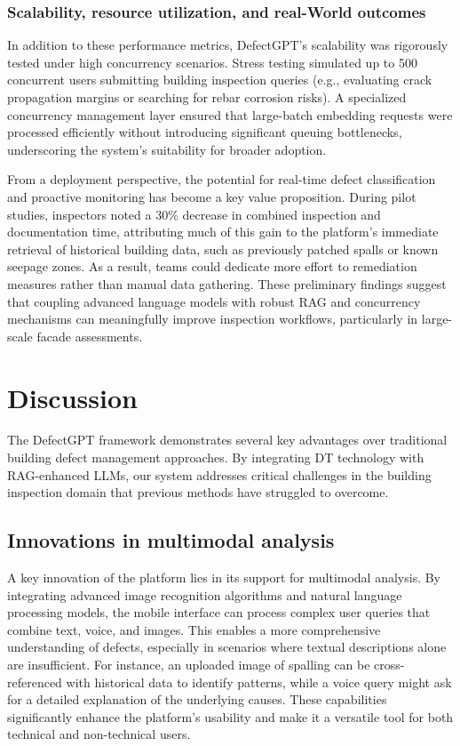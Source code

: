 \documentclass[a4paper,fleqn]{cas-sc}
\begin{document}
\subsubsection{Scalability, resource utilization, and real-World outcomes}

In addition to these performance metrics, DefectGPT's scalability was rigorously tested under high concurrency scenarios. Stress testing simulated up to 500 concurrent users submitting building inspection queries (e.g., evaluating crack propagation margins or searching for rebar corrosion risks). A specialized concurrency management layer ensured that large-batch embedding requests were processed efficiently without introducing significant queuing bottlenecks, underscoring the system's suitability for broader adoption.

From a deployment perspective, the potential for real-time defect classification and proactive monitoring has become a key value proposition. During pilot studies, inspectors noted a 30\% decrease in combined inspection and documentation time, attributing much of this gain to the platform's immediate retrieval of historical building data, such as previously patched spalls or known seepage zones. As a result, teams could dedicate more effort to remediation measures rather than manual data gathering. These preliminary findings suggest that coupling advanced language models with robust RAG and concurrency mechanisms can meaningfully improve inspection workflows, particularly in large-scale facade assessments.

\section{Discussion}
\label{sec:discussion}

The DefectGPT framework demonstrates several key advantages over traditional building defect management approaches. By integrating DT technology with RAG-enhanced LLMs, our system addresses critical challenges in the building inspection domain that previous methods have struggled to overcome.

\subsection{Innovations in multimodal analysis}

A key innovation of the platform lies in its support for multimodal analysis. By integrating advanced image recognition algorithms and natural language processing models, the mobile interface can process complex user queries that combine text, voice, and images. This enables a more comprehensive understanding of defects, especially in scenarios where textual descriptions alone are insufficient. For instance, an uploaded image of spalling can be cross-referenced with historical data to identify patterns, while a voice query might ask for a detailed explanation of the underlying causes. These capabilities significantly enhance the platform's usability and make it a versatile tool for both technical and non-technical users.
\end{document}
